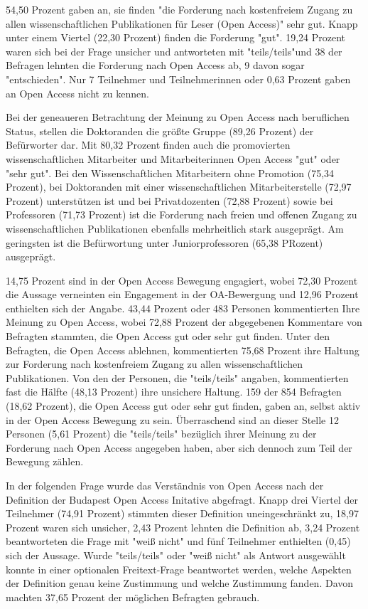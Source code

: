 54,50 Prozent gaben an, sie finden "die Forderung nach kostenfreiem Zugang zu allen wissenschaftlichen Publikationen für Leser (Open Access)" sehr gut. Knapp unter einem Viertel (22,30 Prozent) finden die Forderung "gut". 19,24 Prozent waren sich bei der Frage unsicher und antworteten mit "teils/teils"und 38 der Befragen lehnten die Forderung nach Open Access ab, 9 davon sogar "entschieden". Nur 7 Teilnehmer und Teilnehmerinnen oder 0,63 Prozent gaben an Open Access nicht zu kennen. 

Bei der geneaueren Betrachtung der Meinung zu Open Access nach beruflichen Status, stellen die Doktoranden die größte Gruppe (89,26 Prozent) der Befürworter dar. Mit 80,32 Prozent finden auch die promovierten wissenschaftlichen Mitarbeiter und Mitarbeiterinnen Open Access "gut" oder "sehr gut". Bei den Wissenschaftlichen Mitarbeitern ohne Promotion (75,34 Prozent), bei Doktoranden mit einer wissenschaftlichen Mitarbeiterstelle (72,97 Prozent) unterstützen ist und bei Privatdozenten (72,88 Prozent) sowie bei Professoren (71,73 Prozent) ist die Forderung nach freien und offenen Zugang zu wissenschaftlichen Publikationen ebenfalls mehrheitlich stark ausgeprägt.  Am geringsten ist die Befürwortung unter Juniorprofessoren (65,38 PRozent) ausgeprägt. 

14,75 Prozent sind in der Open Access Bewegung engagiert, wobei 72,30 Prozent die Aussage verneinten ein Engagement in der OA-Bewergung und 12,96 Prozent enthielten sich der Angabe. 43,44 Prozent oder 483 Personen kommentierten Ihre Meinung zu Open Access, wobei 72,88 Prozent der abgegebenen Kommentare von Befragten stammten, die Open Access gut oder sehr gut finden. Unter den Befragten, die Open Access ablehnen, kommentierten 75,68 Prozent ihre Haltung zur Forderung nach kostenfreiem Zugang zu allen wissenschaftlichen Publikationen. Von den der Personen, die "teils/teils" angaben, kommentierten fast die Hälfte (48,13 Prozent) ihre unsichere Haltung. 159 der 854 Befragten (18,62 Prozent), die Open Access gut oder sehr gut finden, gaben an, selbst aktiv in der Open Access Bewegung zu sein. Überraschend sind an dieser Stelle 12 Personen (5,61 Prozent) die "teils/teils" bezüglich ihrer Meinung zu der Forderung nach Open Access angegeben haben, aber sich dennoch zum Teil der Bewegung zählen.

In der folgenden Frage wurde das Verständnis von Open Access nach der Definition der Budapest Open Access Initative \cite{boai_2012} abgefragt. Knapp drei Viertel der Teilnehmer (74,91 Prozent) stimmten dieser Definition uneingeschränkt zu, 18,97 Prozent waren sich unsicher, 2,43 Prozent lehnten die Definition ab, 3,24 Prozent beantworteten die Frage mit "weiß nicht" und fünf Teilnehmer enthielten (0,45) sich der Aussage. Wurde "teils/teils" oder "weiß nicht" als Antwort ausgewählt konnte in einer optionalen Freitext-Frage beantwortet werden, welche Aspekten der Definition genau keine Zustimmung und welche Zustimmung fanden. Davon machten 37,65 Prozent der möglichen Befragten gebrauch.

